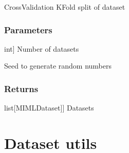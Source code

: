\documentclass[letterpaper,10pt,english]{sphinxmanual}
\begin{document}
\begin{fulllineitems}
\begin{fulllineitems}
\begin{description}
\end{description}

\end{fulllineitems}


\begin{fulllineitems}
\label{\detokenize{data/_autosummary/miml.data.miml_dataset.MIMLDataset:miml.data.miml_dataset.MIMLDataset.split_dataset_cv}}
\pysigstartsignatures
{}
\pysigstopsignatures
\sphinxAtStartPar
CrossValidation K\sphinxhyphen{}Fold split of dataset


\subsubsection{Parameters}
\label{\detokenize{data/_autosummary/miml.data.miml_dataset.MIMLDataset:id38}}\begin{description}
\sphinxlineitem{folds}{[}int{]}
\sphinxAtStartPar
Number of datasets

\sphinxAtStartPar
Seed to generate random numbers

\end{description}


\subsubsection{Returns}
\label{\detokenize{data/_autosummary/miml.data.miml_dataset.MIMLDataset:id39}}\begin{description}
\sphinxlineitem{dataset\_train}{[}list{[}MIMLDataset{]}{]}
\sphinxAtStartPar
Datasets

\end{description}

\end{fulllineitems}


\end{fulllineitems}


\sphinxstepscope


\section{Dataset utils}
\label{\detokenize{data/dataset_utils:dataset-utils}}\label{\detokenize{data/dataset_utils::doc}}
\end{document}

